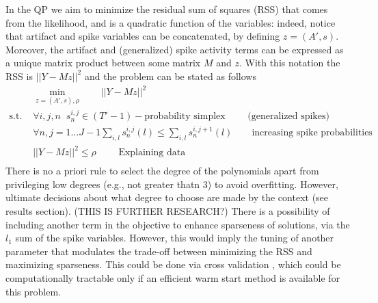 \documentclass[12pt,letterpaper,fleqn]{article}
\begin{document}
In the QP we aim to minimize the residual sum of squares (RSS) that comes from the likelihood, and is a quadratic function of the variables: indeed, notice that artifact and spike variables can be concatenated, by defining $z=(A',s)$. Moreover, the artifact and (generalized) spike activity terms can be expressed as a unique matrix product between some matrix $M$ and $z$. With this notation the RSS is $||Y-Mz||^2$ and the problem can be stated as follows
  \begin{eqnarray}& \displaystyle{\min_{z=(A',s),\rho}\quad \quad  ||Y-Mz||^2} \\ \nonumber
  \text{s.t. } &  \forall i,j,n \;\; s_n^{i,j}\in (T'-1)-\text{probability simplex }\quad\quad \text{(generalized spikes)}\\ \nonumber
  & \forall n, j=1\ldots J-1\sum_{i,l}s_n^{i,j}(l) \leq \sum_{i,l}s_n^{i,j+1}(l)\quad \quad \text{increasing spike probabilities}\\ \nonumber 
  & ||Y-Mz||^2\leq \rho \quad \quad \text{ Explaining data} \\ \nonumber
\end{eqnarray}
There is no a priori rule to select the degree of the polynomials apart from privileging low degrees (e.g., not greater thatn 3) to avoid overfitting. However, ultimate decisions about what degree to choose are made by the context (see results section). (THIS IS FURTHER RESEARCH?) There is a possibility of including another term in the objective to enhance sparseness of solutions, via the $l_1$ sum of the spike variables. However, this would imply the tuning of another parameter that modulates the trade-off between minimizing the RSS and maximizing sparseness. This could be done via cross validation \cite{HastieEtal01}, which could be computationally tractable only if an efficient warm start method is available for this problem.
\end{document}
